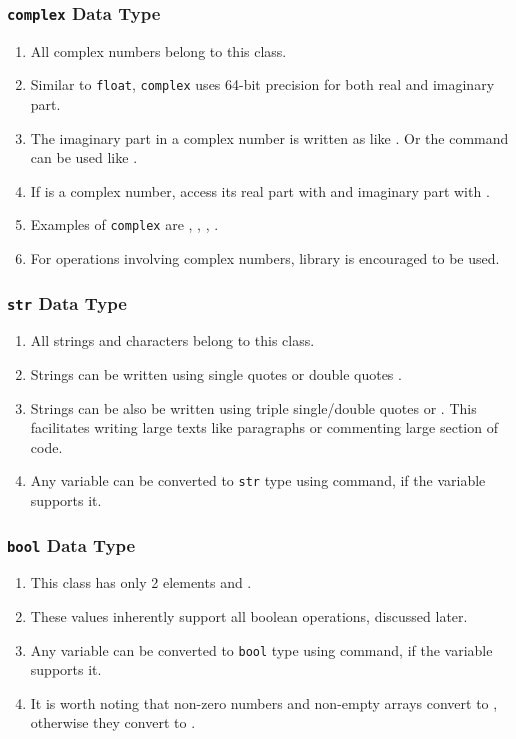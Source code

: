 \documentclass{beamer}
\begin{document}
\begin{frame}[fragile]
\frametitle{\lstinline{complex} Data Type}
\begin{enumerate}
\item All complex numbers belong to this class.
\item Similar to \lstinline{float}, \lstinline{complex} uses 64-bit precision for both real and imaginary part.
\item The imaginary part in a complex number is written as  like . Or the  command can be used like .
\item If  is a complex number, access its real part with  and imaginary part with .
\item Examples of \lstinline{complex} are , , , .
\item For operations involving complex numbers,  library is encouraged to be used.
\end{enumerate}
\end{frame}

\begin{frame}[fragile]
\frametitle{\lstinline{str} Data Type}
\begin{enumerate}
\item All strings and characters belong to this class.
\item Strings can be written using single quotes  or double quotes .
\item Strings can be also be written using triple single/double quotes  or . This facilitates writing large texts like paragraphs or commenting large section of code.
\item Any variable can be converted to \lstinline{str} type using  command, if the variable supports it.
\end{enumerate}
\end{frame}

\begin{frame}[fragile]
\frametitle{\lstinline{bool} Data Type}
\begin{enumerate}
\item This class has only 2 elements  and .
\item These values inherently support all boolean operations, discussed later.
\item Any variable can be converted to \lstinline{bool} type using  command, if the variable supports it.
\item It is worth noting that non-zero numbers and non-empty arrays convert to , otherwise they convert to .
\end{enumerate}
\end{frame}
\end{document}
